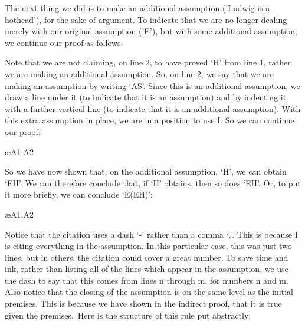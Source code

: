 The next thing we did is to make an additional assumption ('Ludwig is a hothead'), for the sake of argument. To indicate that we are no longer dealing merely with our original assumption ('E'), but with some additional assumption, we continue our proof as follows:
	\begin{fitchproof}
		\open
	\end{fitchproof}				
Note that we are not claiming, on line 2, to have proved `H' from line 1, rather we are making an additional assumption. So, on line 2, we say that we are making an assumption by writing `AS'. Since this is an additional assumption, we draw a line under it (to indicate that it is an assumption) and by indenting it with a further vertical line (to indicate that it is an additional assumption). With this extra assumption in place, we are in a position to use \eand I. So we can continue our proof:
\begin{fitchproof}
	\open
		 \ae{A1,A2}
	\close
\end{fitchproof}

So we have now shown that, on the additional assumption, `H', we can obtain `E\eand H'. We can therefore conclude that, if `H' obtains, then so does `E\eand H'. Or, to put it more briefly, we can conclude `E\eif (E\eand H)':
\begin{fitchproof}
\open
	\ae{A1,A2}
\close
{} 
\end{fitchproof}				

Notice that the citation uses a dash `-' rather than a comma `,'. This is because \eif I is citing everything in the assumption. In this particular case, this was just two lines, but in others, the citation could cover a great number. To save time and ink, rather than listing all of the lines which appear in the assumption, we use the dash to say that this comes from lines n through m, for numbers n and m. Also notice that the closing of the assumption is on the same level as the initial premises. This is because we have shown in the indirect proof, that it is true given the premises. Here is the structure of this rule put abstractly:

